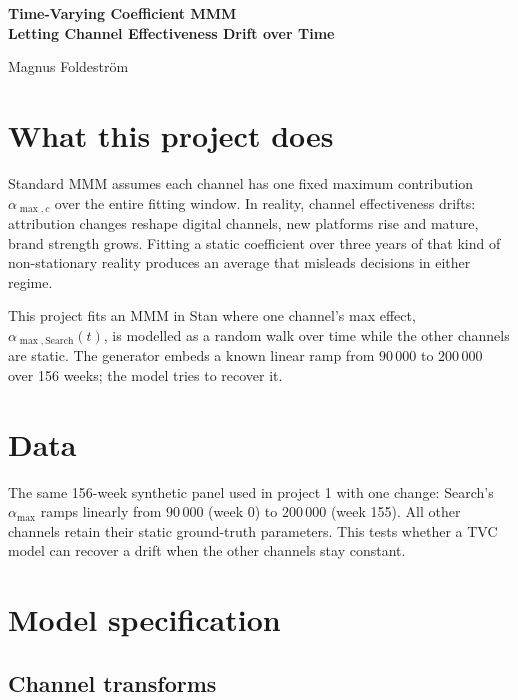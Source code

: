 \documentclass[a4paper,11pt]{article}
\begin{document}
\begin{titlepage}
\thispagestyle{empty}
\centering
\vspace*{3cm}
{\Huge\bfseries Time-Varying Coefficient MMM\\\bigskip
\LARGE Letting Channel Effectiveness Drift over Time
\par}
\vspace{1.5cm}
{\Large Magnus Foldeström\par}
\vfill
\end{titlepage}

\section{What this project does}

Standard MMM assumes each channel has one fixed maximum contribution
$\alpha_{\max, c}$ over the entire fitting window. In reality,
channel effectiveness drifts: attribution changes reshape digital
channels, new platforms rise and mature, brand strength grows.
Fitting a static coefficient over three years of that kind of
non-stationary reality produces an average that misleads decisions in
either regime.

This project fits an MMM in Stan where one channel's max effect,
$\alpha_{\max, \text{Search}}(t)$, is modelled as a random walk over
time while the other channels are static. The generator embeds a
known linear ramp from $90\,000$ to $200\,000$ over 156 weeks; the
model tries to recover it.

\section{Data}

The same 156-week synthetic panel used in project 1 with one change:
Search's $\alpha_{\max}$ ramps linearly from $90\,000$ (week 0) to
$200\,000$ (week 155). All other channels retain their static
ground-truth parameters. This tests whether a TVC model can recover
a drift when the other channels stay constant.

\section{Model specification}

\subsection{Channel transforms}
\end{document}
